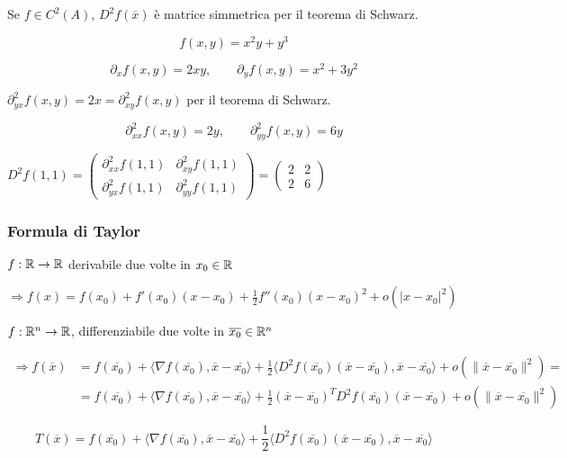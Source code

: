 \begin{attbar}
	Se $f \in  C^2(A)$, $D^2f(\overline{x})$ è matrice simmetrica per il teorema di Schwarz.
\end{attbar}


\begin{exbar}
	$$f(x,y)=x^2y+y^3$$
	
	$$\partial_x f(x,y)=2xy, \qquad \partial_y f(x,y)=x^2+3y^2$$
	
	{\centering $\partial_{yx}^2f(x,y)=2x=\partial_{xy}^2f(x,y)$ per il teorema di Schwarz. \par}
	
	$$\partial_{xx}^2f(x,y)=2y, \qquad \partial_{yy}^2f(x,y)=6y$$
	
	$D^2f(1,1)=
	\begin{pmatrix}
		\partial_{xx}^2f(1,1) & \partial_{xy}^2f(1,1)
		\\
		\partial_{yx}^2f(1,1)& \partial_{yy}^2f(1,1)
	\end{pmatrix} =
	\begin{pmatrix}
		2 & 2 \\
		2 & 6
	\end{pmatrix}$
\end{exbar}


\subsubsection{Formula di Taylor}

$f: \mathbb{R} \rightarrow \mathbb{R}$ derivabile due volte in $x_0 \in \mathbb{R}$

$\Rightarrow f(x)=f(x_0)+f'(x_0)(x-x_0)+\frac{1}{2}f''(x_0)(x-x_0)^2+o(|x-x_0|^2)$

$f: \mathbb{R}^n \rightarrow \mathbb{R}$, differenziabile due volte in $\overline{x_0} \in \mathbb{R}^n $

\begin{align*} 
	\Rightarrow f(\overline{x})
	&=f(\overline{x_0})+\langle \nabla f(\overline{x_0}), \overline{x}-\overline{x_0} \rangle + \frac{1}{2} \langle D^2f(\overline{x_0})(\overline{x}-\overline{x_0}), \overline{x}-\overline{x_0} \rangle + o(\|\overline{x}-\overline{x_0}\|^2) =
	\\
	&=f(\overline{x_0})+\langle \nabla f(\overline{x_0}), \overline{x}-\overline{x_0} \rangle + \frac{1}{2} (\overline{x}-\overline{x_0})^TD^2 f(\overline{x_0})(\overline{x}-\overline{x_0})+o(\|\overline{x}-\overline{x_0}\|^2)
\end{align*}
\begin{attbar}
	\begin{equation*}
		T(\overline{x})=f(\overline{x_0}) +\langle\nabla 	f(\overline{x_0}),\overline{x}-\overline{x_0} \rangle +\frac{1}{2} \langle D^2f(\overline{x_0})(\overline{x} -\overline{x_0}),\overline{x}-\overline{x_0} \rangle
	\end{equation*}
\end{attbar}

